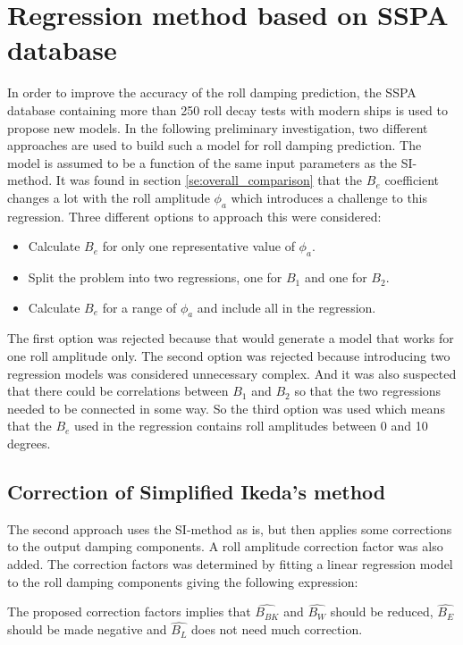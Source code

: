 \section{Regression method based on SSPA database}
\label{se:correction_SI_method}
In order to improve the accuracy of the roll damping prediction, the SSPA database containing more than 250 roll decay tests with modern ships is used to propose new models. In the following preliminary investigation, two different approaches are used to build such a model for roll damping prediction. The model is assumed to be a function of the same input parameters as the SI-method. It was found in section \ref{se:overall_comparison} that the $B_e$ coefficient changes a lot with the roll amplitude $\phi_a$ which introduces a challenge to this regression. Three different options to approach this were considered:
\begin{itemize}
    \item Calculate $B_e$ for only one representative value of $\phi_a$.
    \item Split the problem into two regressions, one for $B_1$ and one for $B_2$.
    \item Calculate $B_e$ for a range of $\phi_a$ and include all in the regression.
\end{itemize}
The first option was rejected because that would generate a model that works for one roll amplitude only. The second option was rejected because introducing two regression models was considered unnecessary complex. And it was also suspected that there could be correlations between $B_1$ and $B_2$ so that the two regressions needed to be connected in some way. So the third option was used which means that the $B_e$ used in the regression contains roll amplitudes between 0 and 10 degrees.  

\subsection{Correction of Simplified Ikeda's method}
The second approach uses the SI-method as is, but then applies some corrections to the output damping components. A roll amplitude correction factor was also added. The correction factors was determined by fitting a linear regression model to the roll damping components giving the following expression: 

The proposed correction factors implies that $\hat{B_{BK}}$ and $\hat{B_{W}}$ should be reduced, $\hat{B_{E}}$ should be made negative and $\hat{B_{L}}$ does not need much correction.


